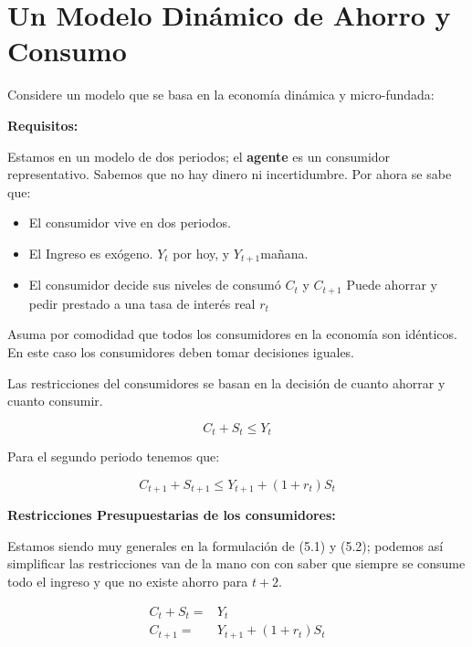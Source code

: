 
\section{Un Modelo Dinámico de Ahorro y Consumo}

Considere un modelo que se basa en la economía dinámica y micro-fundada: 

\textbf{Requisitos:}

Estamos en un modelo de dos periodos; el \textbf{agente} es un consumidor representativo. Sabemos que no hay dinero ni incertidumbre. Por ahora se sabe que:

\begin{itemize}
    \item El consumidor vive en dos periodos.
    \item El Ingreso es exógeno. $Y_{t}$ por hoy, y $Y_{t+1} $mañana.
    \item El consumidor decide sus niveles de consumó $C_{t}$ y $C_{t+1}$ Puede ahorrar y pedir prestado a una tasa de interés real $r_{t}$
\end{itemize}

\begin{remark}
Asuma por comodidad que todos los consumidores en la economía son idénticos. En este caso los consumidores deben tomar decisiones iguales.
\end{remark}

Las restricciones del consumidores se basan en la decisión de cuanto ahorrar y cuanto consumir. 

\begin{equation}
    C_{t}+S_{t} \leq Y_{t}
\end{equation}

Para el segundo periodo tenemos que: 

\begin{equation}
    C_{t+1}+S_{t+1} \leq Y_{t+1}+ (1+r_{t})S_{t}
\end{equation}

\textbf{Restricciones Presupuestarias de los consumidores:}

Estamos siendo muy generales en la formulación de (5.1) y (5.2); podemos así simplificar las restricciones van de la mano con con saber que siempre se consume todo el ingreso y que no existe ahorro para $t+2$.

\begin{align}
    C_{t}+S_{t} = & Y_{t}\\
    C_{t+1}=& Y_{t+1}+(1+r_{t})S_{t}
\end{align}

